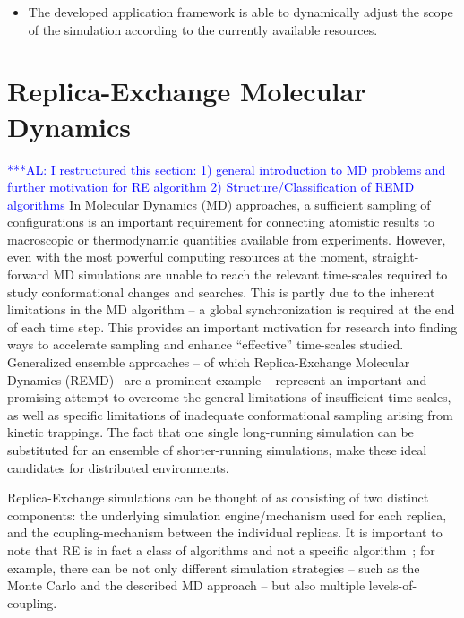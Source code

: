 \documentclass{rspublic}
\newcommand{\alnote}[1]{ {\textcolor{blue} { ***AL: #1 }}}
\newcommand{\alnote}[1]{}
\begin{document}
\begin{itemize}
  \item The developed application framework is able to dynamically
    adjust the scope of the simulation according to the currently
    available resources.

\end{itemize}
\fi

\section{Replica-Exchange Molecular Dynamics}
\alnote{I restructured this section: 1) general introduction to MD
  problems and further motivation for RE algorithm 2)
  Structure/Classification of REMD algorithms}  In Molecular
Dynamics (MD) approaches, a sufficient sampling of configurations is
an important requirement for connecting atomistic results to
macroscopic or thermodynamic quantities available from experiments.
However, even with the most powerful computing resources at the
moment, straight-forward MD simulations are unable to reach the
relevant time-scales required to study conformational changes and
searches. This is partly due to the inherent limitations in the MD
algorithm -- a global synchronization is required at the end of each
time step.  This provides an important motivation for research into
finding ways to accelerate sampling and enhance ``effective''
time-scales studied. Generalized ensemble approaches -- of which
Replica-Exchange Molecular Dynamics (REMD)~\citep{Sugita:1999rm} are a
prominent example -- represent an important and promising attempt to
overcome the general limitations of insufficient time-scales, as well
as specific limitations of inadequate conformational sampling arising
from kinetic trappings.  The fact that one single long-running
simulation can be substituted for an ensemble of shorter-running
simulations, make these ideal candidates for distributed environments.

Replica-Exchange simulations can be thought of as consisting of
two distinct components: the underlying simulation engine/mechanism
used for each replica, and the coupling-mechanism between the
individual replicas.  It is important to note that RE is in fact a
class of algorithms and not a specific
algorithm~\citep{dpa-paper}; for example, there can be not only
different simulation strategies -- such as the Monte Carlo and the
described MD approach -- but also multiple levels-of-coupling.  
\end{document}
